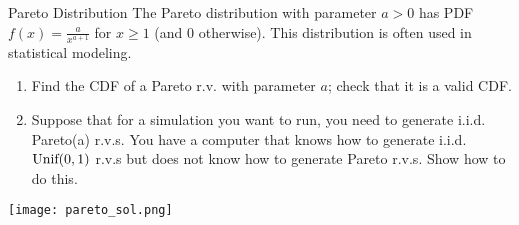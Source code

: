 \documentclass[11.5pt]{article}
\begin{document}






\begin{exercise}{Pareto Distribution} 
The Pareto distribution with parameter $a > 0$ has PDF $f(x) =\frac {a}{x^{a+1}}$ for $x \geq 1$ (and 0 otherwise). This distribution is often used in statistical modeling. 
\begin{enumerate}
\item Find the CDF of a Pareto r.v. with parameter $a$; check that it is a valid CDF. 

\item Suppose that for a simulation you want to run, you need to generate i.i.d. Pareto(a) r.v.s. You have a computer that knows how to generate i.i.d. $\textrm{Unif}(0, 1)$ r.v.s but does not know how to generate Pareto r.v.s. Show how to do this.
\end{enumerate}

\end{exercise}

\begin{solution}{3}
\texttt{[image: pareto\_sol.png]}

\end{solution}
\end{document}
